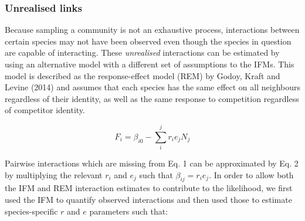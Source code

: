 \documentclass[a4,12pt]{article}
\begin{document}
        

    \subsubsection{Unrealised links}
        
        Because sampling a community is not an exhaustive process, interactions between certain species may not have been observed even though the species in question are capable of interacting. These \textit{unrealised} interactions can be estimated by using an alternative model with a different set of assumptions to the IFMs. This model is described as the response-effect model (REM) by Godoy, Kraft and Levine (2014) and assumes that each species has the same effect on all neighbours regardless of their identity, as well as the same response to competition regardless of competitor identity. 
        
        \begin{equation}
        F_{i} = \beta_{i0} - \sum_{i}^{j} r_{i} e_{j} N_{j}
        \label{rem1}
        \end{equation}
        
        Pairwise interactions which are missing from Eq. 1 can be approximated by Eq. 2 by multiplying the relevant $r_{i}$ and $e_{j}$ such that $\beta_{ij} = r_{i} e_{j}$. In order to allow both the IFM and REM interaction estimates to contribute to the likelihood, we first used the IFM to quantify observed interactions and then used those to estimate species-specific $r$ and $e$ parameters such that: 
    
\end{document}
